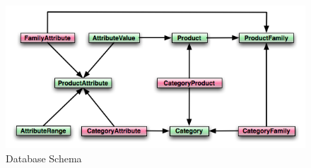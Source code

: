 \documentclass[letterpaper, 12pt]{article}
\begin{document}
\begin{figure}
\includegraphics[scale=0.9]{schema}
\caption{\label{schema02}Database Schema}
\end{figure}


\end{document}
